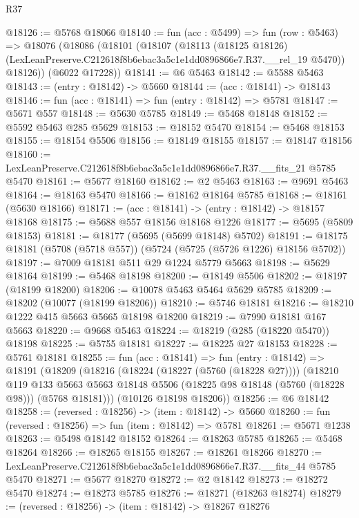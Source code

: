 \begin{lexlean}{R37}
\begin{coremodule}
@18126 := @5768 @18066
@18140 := fun (acc : @5499) =>
  fun (row : @5463) =>
  @18076
    (@18086
      (@18101
        (@18107
          (@18113
            (@18125 @18126)
            (LexLeanPreserve.C212618f8b6ebac3a5c1e1dd0896866e7.R37.__rel_19 @5470))
          @18126))
      (@6022 @17228))
@18141 := @6 @5463
@18142 := @5588 @5463
@18143 := (entry : @18142) -> @5660
@18144 := (acc : @18141) -> @18143
@18146 := fun (acc : @18141) => fun (entry : @18142) => @5781
@18147 := @5671 @557
@18148 := @5630 @5785
@18149 := @5468 @18148
@18152 := @5592 @5463 @285 @5629
@18153 := @18152 @5470
@18154 := @5468 @18153
@18155 := @18154 @5506
@18156 := @18149 @18155
@18157 := @18147 @18156
@18160 := LexLeanPreserve.C212618f8b6ebac3a5c1e1dd0896866e7.R37.__fits_21 @5785 @5470
@18161 := @5677 @18160
@18162 := @2 @5463
@18163 := @9691 @5463
@18164 := @18163 @5470
@18166 := @18162 @18164 @5785
@18168 := @18161 (@5630 @18166)
@18171 := (acc : @18141) -> (entry : @18142) -> @18157 @18168
@18175 := @5688 @557 @18156 @18168 @1226
@18177 := @5695 (@5809 @18153)
@18181 := @18177 (@5695 (@5699 @18148) @5702)
@18191 := @18175 @18181 (@5708 (@5718 @557)) (@5724 (@5725 (@5726 @1226) @18156 @5702))
@18197 := @7009 @18181 @511 @29 @1224 @5779 @5663
@18198 := @5629 @18164
@18199 := @5468 @18198
@18200 := @18149 @5506
@18202 := @18197 (@18199 @18200)
@18206 := @10078 @5463 @5464 @5629 @5785
@18209 := @18202 (@10077 (@18199 @18206))
@18210 := @5746 @18181
@18216 := @18210 @1222 @415 @5663 @5665 @18198 @18200
@18219 := @7990 @18181 @167 @5663
@18220 := @9668 @5463
@18224 := @18219 (@285 (@18220 @5470)) @18198
@18225 := @5755 @18181
@18227 := @18225 @27 @18153
@18228 := @5761 @18181
@18255 := fun (acc : @18141) =>
  fun (entry : @18142) =>
  @18191
    (@18209
      (@18216
        (@18224 (@18227 (@5760 (@18228 @27))))
        (@18210
          @119
          @133
          @5663
          @5663
          @18148
          @5506
          (@18225 @98 @18148 (@5760 (@18228 @98)))
          (@5768 @18181)))
      (@10126 @18198 @18206))
@18256 := @6 @18142
@18258 := (reversed : @18256) -> (item : @18142) -> @5660
@18260 := fun (reversed : @18256) => fun (item : @18142) => @5781
@18261 := @5671 @1238
@18263 := @5498 @18142 @18152
@18264 := @18263 @5785
@18265 := @5468 @18264
@18266 := @18265 @18155
@18267 := @18261 @18266
@18270 := LexLeanPreserve.C212618f8b6ebac3a5c1e1dd0896866e7.R37.__fits_44 @5785 @5470
@18271 := @5677 @18270
@18272 := @2 @18142
@18273 := @18272 @5470
@18274 := @18273 @5785
@18276 := @18271 (@18263 @18274)
@18279 := (reversed : @18256) -> (item : @18142) -> @18267 @18276

\end{coremodule}
\end{lexlean}
